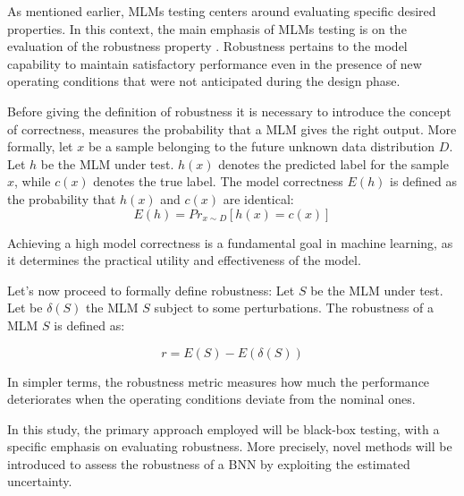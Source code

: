 As mentioned earlier, MLMs testing centers around evaluating specific desired properties. In this context, the main emphasis of MLMs testing is on the evaluation of the robustness property \cite{Marijan_2020}. Robustness pertains to the model capability to maintain satisfactory performance even in the presence of new operating conditions that were not anticipated during the design phase.

Before giving the definition of robustness it is necessary to introduce the concept of correctness, measures the probability that a MLM gives the right output. More formally, let $x$ be a sample belonging to the future unknown data distribution $D$. Let $h$ be the MLM under test. $h(x)$ denotes the predicted label for the sample $x$, while $c(x)$ denotes the true label. The model correctness $E(h)$ is defined as the probability that $h(x)$ and $c(x)$ are identical:
\[
	E(h)  = Pr_{x\sim D}[h(x) = c(x)]
\]

Achieving a high model correctness is a fundamental goal in machine learning, as it determines the practical utility and effectiveness of the model. 

Let's now proceed to formally define robustness: Let $S$ be the MLM under test. Let be $\delta (S)$ the MLM $S$ subject to some perturbations. The robustness of a MLM $S$ is defined as:

\[
	r = E(S) - E(\delta (S))
\]

In simpler terms, the robustness metric measures how much the performance deteriorates when the operating conditions deviate from the nominal ones.

In this study, the primary approach employed will be black-box testing, with a specific emphasis on evaluating robustness. More precisely, novel methods will be introduced to assess the robustness of a BNN by exploiting the estimated uncertainty.